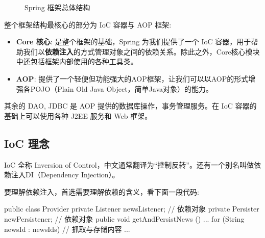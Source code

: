 \begin{figure}[H]
    \caption{Spring 框架总体结构}
    \label{fig:Spring 框架总体结构}
\end{figure}

整个框架结构最核心的部分为 IoC 容器与 AOP 框架:
\begin{itemize}
    \item \textbf{Core 核心}: 是整个框架的基础，Spring 为我们提供了一个 IoC 容器，用于帮助我们以\textbf{依赖注入}的方式管理对象之间的依赖关系。除此之外，Core核心模块中还包括框架内部使用的各种工具类。
    \item \textbf{AOP}: 提供了一个轻便但功能强大的AOP框架，让我们可以以AOP的形式增强各POJO（Plain Old Java Object，简单Java对象）的能力。
\end{itemize}

其余的 DAO, JDBC 是 AOP 提供的数据库操作，事务管理服务。在 IoC 容器的基础上可以使用各种 J2EE 服务和 Web 框架。

\subsection{IoC 理念}

IoC 全称 Inversion of Control，中文通常翻译为“控制反转”。还有一个别名叫做依赖注入DI（Dependency Injection）。


要理解依赖注入，首选需要理解依赖的含义，看下面一段代码:

\begin{Java}
public class Provider {
    private Listener newsListener;      // 依赖对象
    private Persister newPersistener;   // 依赖对象
    public void getAndPersistNews () {
        ...
        for (String newsId : newsIds) {
            // 抓取与存储内容
            ...
        }
    }
}
\end{Java}

